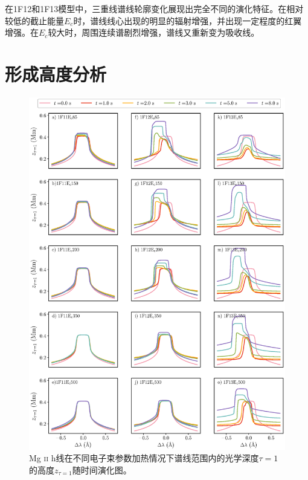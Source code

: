 在1F12和1F13模型中，三重线谱线轮廓变化展现出完全不同的演化特征。在相对较低的截止能量$E_c$时，谱线线心出现的明显的辐射增强，并出现一定程度的红翼增强。在$E_c$较大时，周围连续谱剧烈增强，谱线又重新变为吸收线。




\section{形成高度分析}\label{sec:4.4}

\begin{figure}
	\centering
	\includegraphics[width=\textwidth]{figs/dMe_MgIIh_tau1}
	\caption{Mg \textsc{ii} h线在不同电子束参数加热情况下谱线范围内的光学深度$\tau = 1$的高度$z_{\tau=1}$随时间演化图。}
	\label{fig:4.8}
\end{figure}

